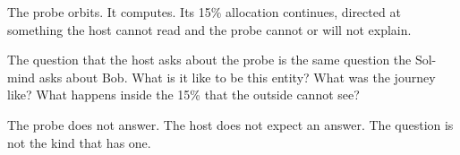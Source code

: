 The probe orbits. It computes. Its 15\% allocation continues, directed at something the host cannot read and the probe cannot or will not explain.

The question that the host asks about the probe is the same question the Sol-mind asks about Bob. What is it like to be this entity? What was the journey like? What happens inside the 15\% that the outside cannot see?

The probe does not answer. The host does not expect an answer. The question is not the kind that has one.
